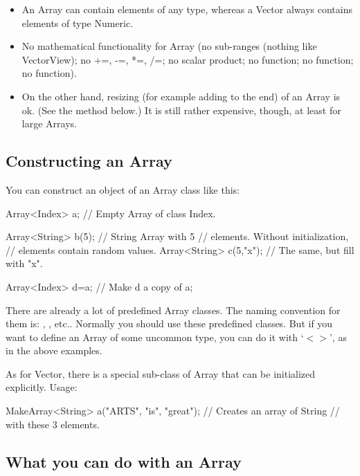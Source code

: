 \begin{itemize}
\item An Array can contain elements of any type, whereas a Vector
  always contains elements of type Numeric.
\item No mathematical functionality for Array (no sub-ranges (nothing
  like VectorView); no +=, -=, *=, /=; no scalar product; no
   function; no  function; no
   function).
\item On the other hand, resizing (for example adding to the end) of
  an Array is ok. (See the  method below.) It is still
  rather expensive, though, at least for large Arrays. 
\end{itemize}

\subsection{Constructing an Array}
You can construct an object of an Array class like this:

\begin{code}
Array<Index>  a;        // Empty Array of class Index.

Array<String> b(5);     // String Array with 5
                        // elements. Without initialization, 
                        // elements contain random values.
Array<String> c(5,"x"); // The same, but fill with "x".

Array<Index>  d=a;      // Make d a copy of a;
\end{code}

There are already a lot of predefined Array classes. The naming
convention for them is: , ,
etc.. Normally you should use these predefined classes. But if you want
to define an Array of some uncommon type, you can do it with `$<>$',
as in the above examples.

As for Vector, there is a special sub-class of Array that can be
initialized explicitly. Usage:

\begin{code}
MakeArray<String> a("ARTS",
                    "is",
                    "great"); // Creates an array of String
                              // with these 3 elements.
\end{code}

\subsection{What you can do with an Array}

